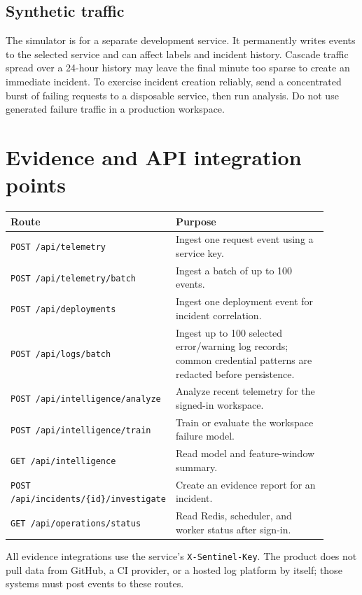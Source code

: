 \documentclass[11pt,a4paper]{article}
\begin{document}
\subsection{Synthetic traffic}
The simulator is for a separate development service. It permanently writes
events to the selected service and can affect labels and incident history.
Cascade traffic spread over a 24-hour history may leave the final minute too
sparse to create an immediate incident. To exercise incident creation reliably,
send a concentrated burst of failing requests to a disposable service, then run
analysis. Do not use generated failure traffic in a production workspace.

\section{Evidence and API integration points}

\begin{longtable}{p{0.34\linewidth}p{0.56\linewidth}}
\toprule
\textbf{Route} & \textbf{Purpose} \\
\midrule
\texttt{POST /api/telemetry} & Ingest one request event using a service key. \\
\texttt{POST /api/telemetry/batch} & Ingest a batch of up to 100 events. \\
\texttt{POST /api/deployments} & Ingest one deployment event for incident correlation. \\
\texttt{POST /api/logs/batch} & Ingest up to 100 selected error/warning log records;
common credential patterns are redacted before persistence. \\
\texttt{POST /api/intelligence/analyze} & Analyze recent telemetry for the signed-in workspace. \\
\texttt{POST /api/intelligence/train} & Train or evaluate the workspace failure model. \\
\texttt{GET /api/intelligence} & Read model and feature-window summary. \\
\texttt{POST /api/incidents/\{id\}/investigate} & Create an evidence report for an incident. \\
\texttt{GET /api/operations/status} & Read Redis, scheduler, and worker status after sign-in. \\
\bottomrule
\end{longtable}

All evidence integrations use the service's \texttt{X-Sentinel-Key}. The product
does not pull data from GitHub, a CI provider, or a hosted log platform by itself;
those systems must post events to these routes.
\end{document}
